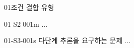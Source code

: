 \clearpage

\begin{steptwo}

\begin{type}{01}{조건 결합 유형}
\begin{problem}{01-S2-001}{m}
...
\end{problem}
\end{type}

\end{steptwo}

\clearpage

\begin{stepthree}

\begin{problem}{01-S3-001}{s}
다단계 추론을 요구하는 문제 ...
\end{problem}

\end{stepthree}
